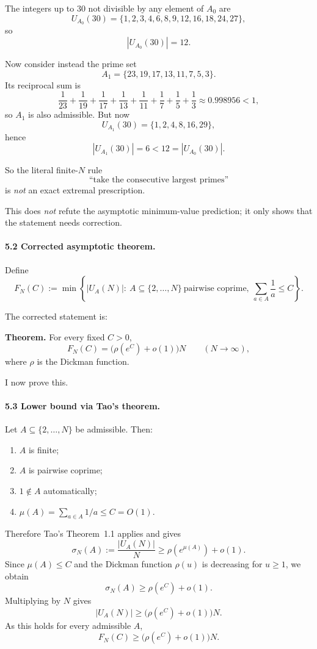 The integers up to $30$ not divisible by any element of $A_0$ are
\[
U_{A_0}(30)=\{1,2,3,4,6,8,9,12,16,18,24,27\},
\]
so
\[
|U_{A_0}(30)|=12.
\]

Now consider instead the prime set
\[
A_1=\{23,19,17,13,11,7,5,3\}.
\]
Its reciprocal sum is
\[
\frac1{23}+\frac1{19}+\frac1{17}+\frac1{13}+\frac1{11}+\frac17+\frac15+\frac13
\approx 0.998956<1,
\]
so $A_1$ is also admissible. But now
\[
U_{A_1}(30)=\{1,2,4,8,16,29\},
\]
hence
\[
|U_{A_1}(30)|=6<12=|U_{A_0}(30)|.
\]

So the literal finite-$N$ rule
\[
\mbox{``take the consecutive largest primes''}
\]
is \emph{not} an exact extremal prescription.

This does \emph{not} refute the asymptotic minimum-value prediction; it only shows that the statement needs correction.

\paragraph{5.2 Corrected asymptotic theorem.}

Define
\[
F_N(C):=\min \left\{ |U_A(N)|:\ A\subseteq\{2,\dots,N\}\ \mbox{pairwise coprime},\ \sum_{a\in A}\frac1a\leq C \right\}.
\]

The corrected statement is:

\medskip

\noindent\textbf{Theorem.}
For every fixed $C>0$,
\[
F_N(C)=\bigl(\rho(e^C)+o(1)\bigr)N
\qquad (N\to\infty),
\]
where $\rho$ is the Dickman function.

\medskip

I now prove this.

\paragraph{5.3 Lower bound via Tao's theorem.}

Let $A\subseteq\{2,\dots,N\}$ be admissible. Then:

\begin{enumerate}
\item $A$ is finite;
\item $A$ is pairwise coprime;
\item $1\notin A$ automatically;
\item $\mu(A)=\sum_{a\in A}1/a\leq C=O(1)$.
\end{enumerate}

Therefore Tao's Theorem~1.1 applies and gives
\[
\sigma_N(A):=\frac{|U_A(N)|}{N}\geq \rho(e^{\mu(A)})+o(1).
\]
Since $\mu(A)\leq C$ and the Dickman function $\rho(u)$ is decreasing for $u\geq 1$, we obtain
\[
\sigma_N(A)\geq \rho(e^C)+o(1).
\]
Multiplying by $N$ gives
\[
|U_A(N)|\geq \bigl(\rho(e^C)+o(1)\bigr)N.
\]
As this holds for every admissible $A$,
\[
F_N(C)\geq \bigl(\rho(e^C)+o(1)\bigr)N.
\]

